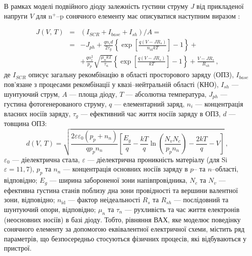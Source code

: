 В рамках моделі подвійного діоду залежність густини струму $J$ від прикладеної напруги $V$ для  n$^+$--p сонячного елементу має описуватися
наступним виразом \cite{2Diod:Ishaque,2Diod:Buhler}:

\begin{eqnarray}
\label{eqSSCIV}
\nonumber J(V,\,T)&=&\left(I_{SCR}+I_{base}+I_{sh}\right)/A=\\
\nonumber &=&-J_{ph}+\frac{qn_id}{2\tau_{g}}\left\{\exp \left[\frac{q(V-JR_s)}{n_\mathrm{id}kT}\right]-1\right\}+\\
&&+\frac{qn_i^2}{p_p}\sqrt{\frac{\mu_nkT}{\tau_n}}\left\{\exp \left[\frac{q(V-JR_s)}{kT}\right]-1\right\}+\frac{V-JR_s}{R_{sh}}\,,
\end{eqnarray}
де
$I_{SCR}$ описує загальну рекомбінацію в області просторового заряду (ОПЗ),
$I_{base}$ пов'язане з процесами рекомбінації у квазі--нейтральній області (КНО),
$I_{sh}$ --- шунтуючий струм,
$A$ --- площа діоду,
$T$ --- абсолютна температура,
$J_{ph}$ --- густина фотогенерованого струму,
$q$ --- елементарний заряд,
$n_i$ --- концентрація власних носіїв заряду,
$\tau_{g}$  --- ефективний час життя носіїв заряду в ОПЗ,
$d$ --- товщина ОПЗ:
\begin{equation}
\label{eqW}
    d(V,\,T)=\sqrt{\frac{2 \varepsilon \varepsilon_0(p_p+n_n)}{q p_p n_n}\left[\frac{E_g}{q}-\frac{kT}{q}\ln\left(\frac{N_vN_c}{p_pn_n}\right)-\frac{2kT}{q}-V\right]} \,,
\end{equation}
$\varepsilon_0$ --- діелектрична стала,
$\varepsilon$ --- діелектрична проникність матеріалу (для Si $\varepsilon=11,7$),
$p_p$ та $n_n$ --- концентрація основних носіїв заряду в $p$-- та $n$--області, відповідно;
$E_g$ --- ширина забороненої зони напівпровідника,
$N_c$ та $N_v$ --- ефективна густина станів поблизу дна зони провідності та вершини валентної зони, відповідно;
$n_\mathrm{id}$ --- фактор неідеальності
$R_s$ та $R_{sh}$ --- послідовний та шунтуючий опори, відповідно;
$\mu_n$ та $\tau_n$ --- рухливість та час життя електронів (неосновних носіїв) в базі діоду.
Тобто,
рівняння ВАХ, яке моделює поведінку сонячного елементу за допомогою еквівалентної електричної схеми,
містить ряд параметрів, що безпосередньо стосуються фізичних процесів, які відбуваються у пристрої.

